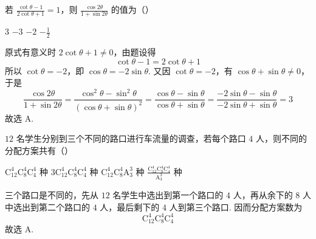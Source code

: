 \begin{problem}
若 \(\frac{\cot\theta-1}{2\cot\theta+1}=1\)，则 \(\frac{\cos 2\theta}{1+\sin 2\theta}\) 的值为（\quad）

\choices
    {\(3\)}
    {\(-3\)}
    {\(-2\)}
    {\(-\frac{1}{2}\)}

\begin{solution}
原式有意义时 \(2\cot\theta+1\ne0\)，由题设得
\[
\cot\theta-1=2\cot\theta+1
\]
所以 \(\cot\theta=-2\)，即 \(\cos\theta=-2\sin\theta\). 又因 \(\cot\theta=-2\)，有 \(\cos\theta+\sin\theta\ne0\)，于是
\[
\frac{\cos2\theta}{1+\sin2\theta}
=\frac{\cos^{2}\theta-\sin^{2}\theta}{(\cos\theta+\sin\theta)^{2}}
=\frac{\cos\theta-\sin\theta}{\cos\theta+\sin\theta}
=\frac{-2\sin\theta-\sin\theta}{-2\sin\theta+\sin\theta}=3
\]
故选 A.
\end{solution}
\end{problem}

\begin{problem}
\(12\) 名学生分别到三个不同的路口进行车流量的调查，若每个路口 \(4\) 人，则不同的分配方案共有（\quad）

\choices
    {\(\mathrm C_{12}^{4}\mathrm C_{8}^{4}\mathrm C_{4}^{4}\) 种}
    {\(3\mathrm C_{12}^{4}\mathrm C_{8}^{4}\mathrm C_{4}^{4}\) 种}
    {\(\mathrm C_{12}^{4}\mathrm C_{8}^{4}\mathrm A_{3}^{3}\) 种}
    {\(\frac{\mathrm C_{12}^{4}\mathrm C_{8}^{4}\mathrm C_{4}^{4}}{\mathrm A_{3}^{3}}\) 种}

\begin{solution}
三个路口是不同的，先从 \(12\) 名学生中选出到第一个路口的 \(4\) 人，再从余下的 \(8\) 人中选出到第二个路口的 \(4\) 人，最后剩下的 \(4\) 人到第三个路口. 因而分配方案数为
\[
\mathrm C_{12}^{4}\mathrm C_{8}^{4}\mathrm C_{4}^{4}
\]
故选 A.
\end{solution}
\end{problem}

